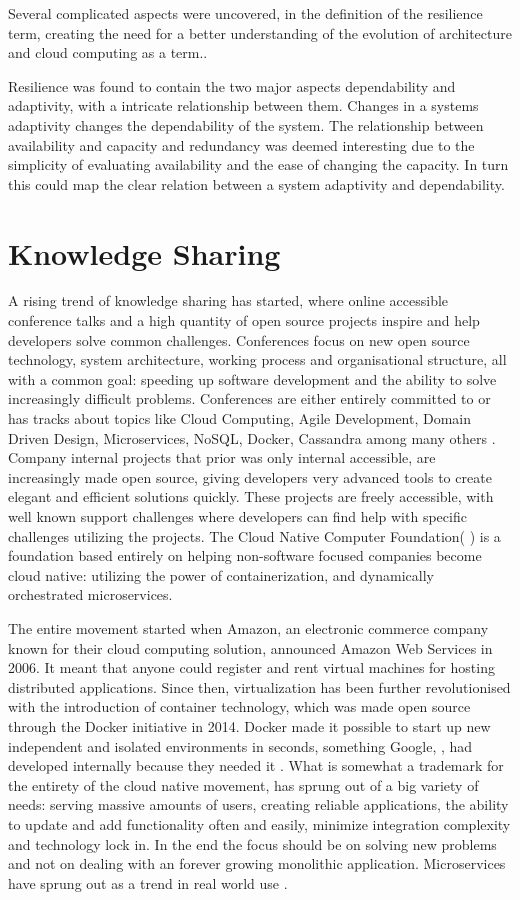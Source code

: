 Several complicated aspects were uncovered, in the definition of the resilience term, creating the need for a better understanding of the evolution of architecture and cloud computing as a term..

Resilience was found to contain the two major aspects dependability and adaptivity, with a intricate relationship between them. Changes in a systems adaptivity changes the dependability of the system. The relationship between availability and capacity and redundancy was deemed interesting due to the simplicity of evaluating availability and the ease of changing the capacity. In turn this could map the clear relation between a system adaptivity and dependability.


\section{Knowledge Sharing}
A rising trend of knowledge sharing has started, where online accessible conference talks and a high quantity of open source projects inspire and help developers solve common challenges. Conferences focus on new open source technology, system architecture, working process and organisational structure, all with a common goal: speeding up software development and the ability to solve increasingly difficult problems. Conferences are either entirely committed to or has tracks about topics like Cloud Computing, Agile Development, Domain Driven Design, Microservices, NoSQL, Docker, Cassandra among many others \cite{george2016it}. Company internal projects that prior was only internal accessible, are increasingly made open source, giving developers very advanced tools to create elegant and efficient solutions quickly. These projects are freely accessible, with well known support challenges where developers can find help with specific challenges utilizing the projects. The Cloud Native Computer Foundation( ) is a foundation based entirely on helping non-software focused companies become cloud native: utilizing the power of containerization, and dynamically orchestrated microservices.

The entire movement started when Amazon, an electronic commerce company known for their cloud computing solution, announced Amazon Web Services in 2006. It meant that anyone could register and rent virtual machines for hosting distributed applications. Since then, virtualization has been further revolutionised with the introduction of container technology, which was made open source through the Docker initiative in 2014. Docker made it possible to start up new independent and isolated environments in seconds, something Google, , had developed internally because they needed it \cite{bernstein2014containers}. What is somewhat a trademark for the entirety of the cloud native movement, has sprung out of a big variety of needs: serving massive amounts of users, creating reliable applications, the ability to update and add functionality often and easily, minimize integration complexity and technology lock in. In the end the focus should be on solving new problems and not on dealing with an forever growing monolithic application. Microservices have sprung out as a trend in real world use \cite[p.~1]{newman2015microservices}.

